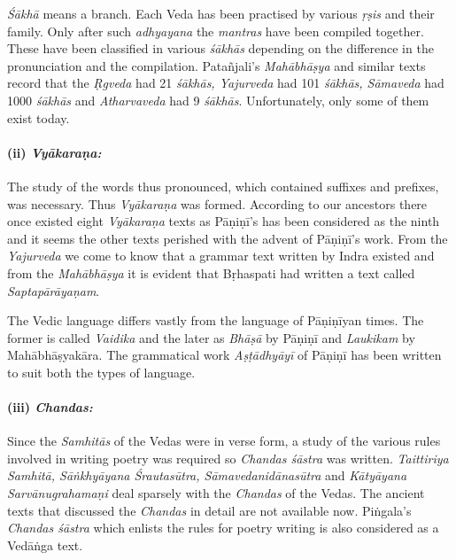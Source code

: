 \textit{Śākhā} means a branch. Each Veda has been practised by various \textit{ṛṣis} and their family. Only after such \textit{adhyayana} the \textit{mantras} have been compiled together. These have been classified in various \textit{śākhās} depending on the difference in the pronunciation and the compilation. Patañjali’s \textit{Mahābhāṣya} and similar texts record that the \textit{Ṛgveda} had 21 \textit{śākhās, Yajurveda} had 101 \textit{śākhās, Sāmaveda} had 1000 \textit{śākhās} and \textit{Atharvaveda} had 9 \textit{śākhās}. Unfortunately, only some of them exist today.


\paragraph*{(ii) \textit{Vyākaraṇa:}}

\vskip -7.3pt

The study of the words thus pronounced, which contained suffixes and prefixes, was necessary. Thus \textit{Vyākaraṇa} was formed. According to our ancestors there once existed eight \textit{Vyākaraṇa} texts as Pāṇiṇī’s has been considered as the ninth and it seems the other texts perished with the advent of Pāṇiṇī’s work. From the \textit{Yajurveda} we come to know that a grammar text written by Indra existed and from the \textit{Mahābhāṣya} it is evident that Bṛhaspati had written a text called \textit{Saptapārāyaṇam}.

The Vedic language differs vastly from the language of Pāṇiṇīyan times. The former is called \textit{Vaidika} and the later as \textit{Bhāṣā} by Pāṇiṇī and \textit{Laukikam} by Mahābhāṣyakāra. The grammatical work \textit{Aṣṭādhyāyī} of Pāṇiṇī has been written to suit both the types of language.


\paragraph*{(iii) \textit{Chandas:}}

\vskip -7.3pt

Since the \textit{Samhitās} of the Vedas were in verse form, a study of the various rules involved in writing poetry was required so \textit{Chandas śāstra} was written. \textit{Taittiriya Samhitā, Sāṅkhyāyana Śrautasūtra, Sāmavedanidānasūtra} and \textit{Kātyāyana Sarvānugrahamaṇi} deal sparsely with the \textit{Chandas} of the Vedas. The ancient texts that discussed the \textit{Chandas} in detail are not available now. Piṅgala’s \textit{Chandas śāstra} which enlists the rules for poetry writing is also considered as a Vedāṅga text.


